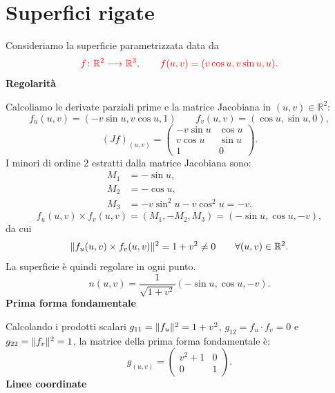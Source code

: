    \section{Superfici rigate}
        \begin{esempio}[Elicoide]
        \mbox{}

        Consideriamo la superficie parametrizzata data da
        \[
        \color{red} f \colon \mathbb{R}^2 \longrightarrow \mathbb{R}^3, \qquad f(u,v) = (v \cos u, v \sin u, u).
        \]
        \textbf{Regolarità}

        Calcoliamo le derivate parziali prime e la matrice Jacobiana in $(u,v) \in \mathbb{R}^2$:
        \[
        f_u(u,v) = (-v \sin u, v \cos u, 1) \qquad f_v(u,v) = (\cos u, \sin u, 0),
        \]
        \[
        (Jf)_{(u,v)} = 
        \begin{pmatrix}
        -v \sin u & \cos u \\
        v \cos u & \sin u \\
        1 & 0
        \end{pmatrix}.
        \]
        I minori di ordine $2$ estratti dalla matrice Jacobiana sono:
        \begin{align*}
        M_1 &= -\sin u, \\
        M_2 &= -\cos u, \\
        M_3 &= -v \sin^2 u - v \cos^2 u = -v.
        \end{align*}
        \[
        f_u(u,v) \times f_v(u,v) = (M_1, -M_2, M_3) = (-\sin u, \cos u, -v),
        \]
        da cui
        \[
        \lVert f_u(u,v) \times f_v(u,v)\rVert^2 = 1 + v^2 \neq 0 \qquad \forall (u,v) \in \mathbb{R}^2.
        \]
        La superficie è quindi regolare in ogni punto. 
        \[
        n(u,v) = \frac{1}{\sqrt{1+v^2}}(-\sin u, \cos u, -v).
        \]
        \textbf{Prima forma fondamentale}

        Calcolando i prodotti scalari $g_{11} = \lVert f_u\rVert^2 = 1 + v^2$, $g_{12} = f_u \cdot f_v = 0$ e $g_{22} = \lVert f_v\rVert^2 = 1$, la matrice della prima forma fondamentale è:
        \[
        g_{(u,v)} = 
        \begin{pmatrix}
        v^2 + 1 & 0 \\
        0 & 1
        \end{pmatrix}.
        \]
        \newpage
        \noindent\textbf{Linee coordinate}


\end{esempio}

